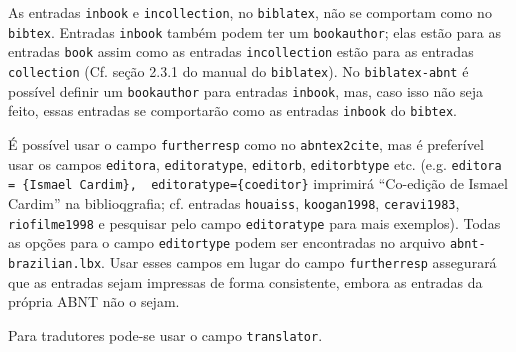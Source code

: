 \documentclass[a4paper]{article}
\begin{document}
\begin{itemize}
\begin{sloppypar}
    \item As entradas \texttt{inbook} e \texttt{incollection}, no \texttt{biblatex}, não se comportam como no \texttt{bibtex}. Entradas \texttt{inbook} também podem ter um \texttt{bookauthor}; elas estão para as entradas \texttt{book} assim como as entradas \texttt{incollection} estão para as entradas \texttt{collection} (Cf. seção 2.3.1 do manual do \texttt{biblatex}). No \texttt{biblatex-abnt} é possível definir um \texttt{bookauthor} para entradas \texttt{inbook}, mas, caso isso não seja feito, essas entradas se comportarão como as entradas \texttt{inbook} do \texttt{bibtex}.
    \item É possível usar o campo \texttt{furtherresp} como no \texttt{abntex2cite}, mas é preferível usar os campos \texttt{editora}, \texttt{editoratype}, \texttt{editorb}, \texttt{editorbtype} etc. (e.g. \verb"editora = {Ismael Cardim},  editoratype={coeditor}" imprimirá ``Co-edição de Ismael Cardim'' na biblioqgrafia; cf. entradas \texttt{hou\-a\-iss}, \texttt{koogan1998}, \texttt{ceravi1983}, \texttt{riofilme1998} e pesquisar pelo campo \texttt{editor\-a\-type} para mais exemplos). Todas as opções para o campo \texttt{editor\-type} podem ser encontradas no arquivo \texttt{abnt-brazilian.lbx}. Usar esses campos em lugar do campo \texttt{furtherresp} assegurará que as entradas sejam impressas de forma consistente, embora as entradas da própria ABNT não o sejam.
    \item Para tradutores pode-se usar o campo \texttt{translator}.
\end{sloppypar}
\end{itemize}

\clearpage
\nocite{*}
\printbibliography
\end{document}
